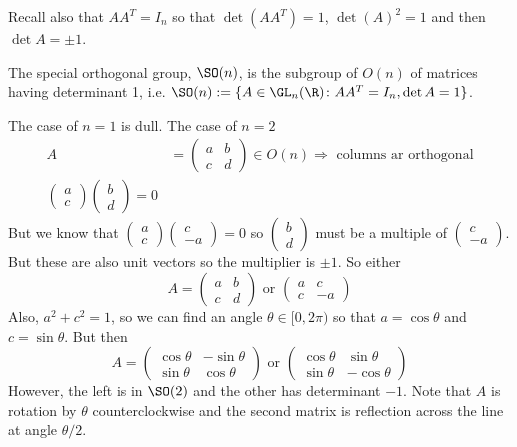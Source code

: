 Recall also that $AA^T=I_n$ so that $\det(AA^T)=1$, $\det(A)^2=1$ and then $\det A = \pm 1$. 

\begin{dfn}
The special orthogonal group, $\SO(n)$, is the subgroup of $O(n)$ of matrices having determinant 1, i.e. $\SO(n):= \{ A \in \GL_n(\R) \colon AA^T=I_n, \det A=1\}$. 
\end{dfn}

\begin{ex}
The case of $n=1$ is dull. The case of $n=2$
	\[
	\begin{split}
	A&=
	\begin{pmatrix}
	a & b \\
	c & d
	\end{pmatrix} \in O(n) \Rightarrow \text{ columns ar orthogonal} \\
	\begin{pmatrix} a \\ c \end{pmatrix} \begin{pmatrix} b \\ d \end{pmatrix}=0
	\end{split}
	\]
But we know that $\begin{pmatrix} a \\ c \end{pmatrix} \begin{pmatrix} c \\ -a \end{pmatrix}=0$ so $\begin{pmatrix} b \\ d \end{pmatrix}$ must be a multiple of $\begin{pmatrix} c \\ -a \end{pmatrix}$. But these are also unit vectors so the multiplier is $\pm 1$. So either 
	\[
	A=
	\begin{pmatrix}
	a & b \\
	c & d
	\end{pmatrix} \text{ or }
	\begin{pmatrix}
	a & c \\
	c & -a
	\end{pmatrix}
	\]
Also, $a^2+c^2=1$, so we can find an angle $\theta \in [0,2\pi)$ so that $a= \cos \theta$ and $c= \sin \theta$. But then 
	\[
	A=
	\begin{pmatrix}
	\cos \theta & -\sin \theta \\
	\sin \theta & \cos \theta
	\end{pmatrix} \text{ or }
	\begin{pmatrix}
	\cos \theta & \sin \theta \\
	\sin \theta & -\cos \theta
	\end{pmatrix}
	\]
However, the left is in $\SO(2)$ and the other has determinant $-1$. Note that $A$ is rotation by $\theta$ counterclockwise and the second matrix is reflection across the line at angle $\theta/2$.
\end{ex}


